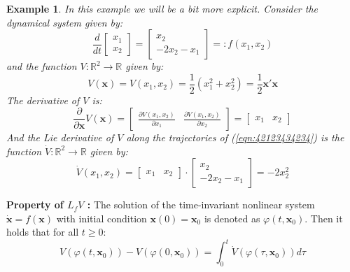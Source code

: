 \documentclass[a4paper,10pt,oneside]{book}
\newtheorem{example}{Example}
\begin{document}
%
%
%
%
\begin{example}
 In this example we will be a bit more explicit. Consider the dynamical system given by:
 \begin{equation}\label{eqn:42123434234}
  \frac{d}{dt}\left[ {\begin{array}{c} x_1\\x_2 \end{array} } \right]=\left[ {\begin{array}{c} x_2\\-2x_2-x_1 \end{array} } \right]=\mathrel{:}f(x_1,x_2)
 \end{equation}
and the function $V:\mathbb{R}^2\to\mathbb{R}$ given by:
\begin{equation}
 V(\mathbf{x})=V(x_1,x_2)=\frac{1}{2}(x_1^2+x_2^2)=\frac{1}{2}\mathbf{x}'\mathbf{x}
\end{equation}
The derivative of $V$ is:
\begin{equation}
 \frac{\partial}{\partial \mathbf{x}}V(\mathbf{x})=\left[ {\begin{array}{cc} \frac{\partial V(x_1,x_2)}{\partial x_1}&\frac{\partial V(x_1,x_2)}{\partial x_2} \end{array} } \right]=\left[ {\begin{array}{cc} x_1&x_2 \end{array} } \right]
\end{equation}
And the Lie derivative of $V$ along the trajectories of (\ref{eqn:42123434234}) is the function $\dot{V}:\mathbb{R}^2\to\mathbb{R}$ given by:
\begin{equation}
 \dot{V}(x_1,x_2)=\left[ {\begin{array}{cc} x_1&x_2 \end{array} } \right]\cdot \left[ {\begin{array}{c} x_2\\-2x_2-x_1 \end{array} } \right]=-2x_2^2
\end{equation}
\end{example}
\noindent \textbf{Property of $L_f V$ :} The solution of the time-invariant nonlinear system $\dot{\mathbf{x}}=f(\mathbf{x})$ with initial condition $\mathbf{x}(0)=\mathbf{x}_0$ is denoted as $\varphi(t,\mathbf{x}_0)$. Then it holds that for all $t\geq 0$:
\begin{equation}
 V(\varphi(t,\mathbf{x}_0))-V(\varphi(0,\mathbf{x}_0))=\int_0^t \dot{V}(\varphi(\tau,\mathbf{x}_0))d\tau
\end{equation}
\end{document}
